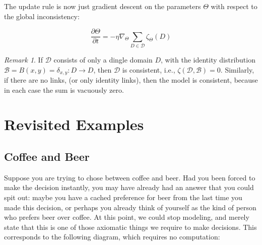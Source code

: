 \documentclass{article}
\theoremstyle{plain}
\theoremstyle{definition}
\theoremstyle{remark}
\newtheorem*{remark}{Remark}
\newcommand\lab[1]{(#1)(lab-#1)}
\begin{document}
 	The update rule is now just gradient descent on the parameters $\Theta$ with respect to the global inconsistency:
 	
 	\[ \frac{\partial \Theta}{\partial t} = - \eta \nabla_\Theta \sum_{D \in \mathcal D} \zeta_\Theta(D) \]
 	
 	
 	\begin{remark}
 		If $\mathcal D$ consists of only a dingle domain $D$, with the identity distribution $\mathcal B = {B(x,y) = \delta_{x,y}: D \to D}$, then $\mathcal D$ is consistent, i.e., $\zeta(\mathcal D, \mathcal B) = 0$. Similarly, if there are no links, (or only identity links), then the model is consistent, because in each case the sum is vacuously zero. 
 	\end{remark}
 	

	
		
	\section{Revisited Examples}
	
	\subsection{Coffee and Beer}
	Suppose you are trying to chose between coffee and beer. Had you been forced to make the decision instantly, you may have already had an answer that you could spit out: maybe you have a cached preference for beer from the last time you made this decision, or perhaps you already think of yourself as the kind of person who prefers beer over coffee. At this point, we could stop modeling, and merely state that this is one of those axiomatic things we require to make decisions. This corresponds to the following diagram, which requires no computation:
	\begin{center}
	\end{center}
	
\end{document}
